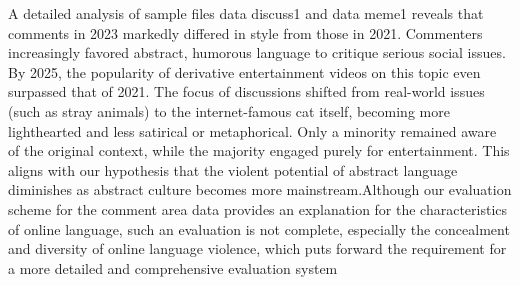 \documentclass[12pt,a4paper]{ctexart}
\begin{document}
A detailed analysis of sample files data discuss1 and data meme1 reveals that comments in 2023 markedly differed in style from those in 2021. Commenters increasingly favored abstract, humorous language to critique serious social issues. By 2025, the popularity of derivative entertainment videos on this topic even surpassed that of 2021. The focus of discussions shifted from real-world issues (such as stray animals) to the internet-famous cat itself, becoming more lighthearted and less satirical or metaphorical. Only a minority remained aware of the original context, while the majority engaged purely for entertainment. This aligns with our hypothesis that the violent potential of abstract language diminishes as abstract culture becomes more mainstream.Although our evaluation scheme for the comment area data provides an explanation for the characteristics of online language, such an evaluation is not complete, especially the concealment and diversity of online language violence, which puts forward the requirement for a more detailed and comprehensive evaluation system
\end{document}
